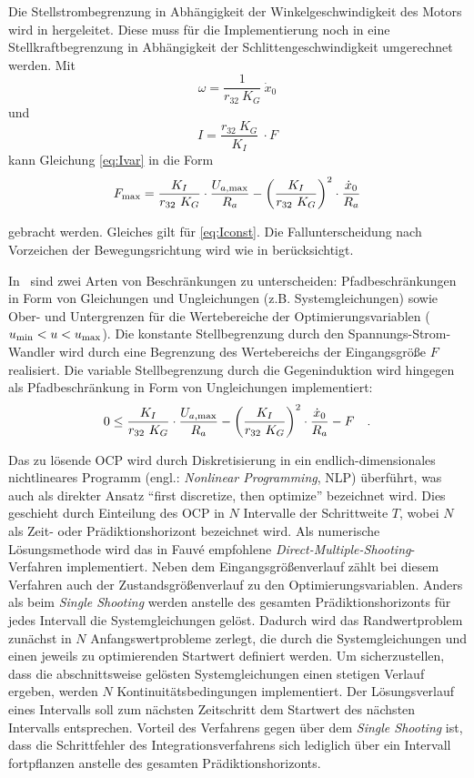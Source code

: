 Die Stellstrombegrenzung in Abhängigkeit der Winkelgeschwindigkeit des Motors wird in  hergeleitet. Diese muss für die Implementierung noch in eine Stellkraftbegrenzung in Abhängigkeit der Schlittengeschwindigkeit umgerechnet werden.
Mit 
	\[
	\omega = \frac{1}{r_{32}\ K_G} \ \dot{x}_0 
\]
und 
	\[
	I = \frac{r_{32}\ K_G}{K_I} \ \cdot F
\]
kann Gleichung \eqref{eq:Ivar} in die Form
	\[
	F_{\mathrm{max}} = \frac{K_I}{r_{32}\ K_G} \cdot \frac{U_{a\mathrm{,max}}}{R_a} - \left(\frac{K_I}{r_{32}\ K_G}\right)^2 \cdot \frac{\dot{x}_0}{R_a}
\]

gebracht werden. Gleiches gilt für \eqref{eq:Iconst}. Die Fallunterscheidung nach Vorzeichen der Bewegungsrichtung wird wie in  berücksichtigt. 

In \casadi\ sind zwei Arten von Beschränkungen zu unterscheiden: Pfadbeschränkungen in Form von Gleichungen und Ungleichungen (z.B. Systemgleichungen) sowie Ober- und Untergrenzen für die Wertebereiche der Optimierungsvariablen (\zB $u_{\mathrm{min}}<u<u_{\mathrm{max}}$). Die konstante Stellbegrenzung durch den Spannungs-Strom-Wandler wird durch eine Begrenzung des Wertebereichs der Eingangsgröße $F$ realisiert. Die variable Stellbegrenzung durch die Gegeninduktion wird hingegen als Pfadbeschränkung in Form von Ungleichungen implementiert:
\[
	 0 \leq \frac{K_I}{r_{32}\ K_G} \cdot \frac{U_{a\mathrm{,max}}}{R_a} - \left(\frac{K_I}{r_{32}\ K_G}\right)^2 \cdot \frac{\dot{x}_0}{R_a} - F \quad .
\]

Das zu lösende OCP wird durch Diskretisierung in ein endlich-dimensionales nichtlineares Programm (engl.: \textit{Nonlinear Programming}, NLP) überführt, was auch als direkter Ansatz \bzw "`first discretize, then optimize"' bezeichnet wird. Dies geschieht durch Einteilung des OCP in $N$ Intervalle der Schrittweite $T$, wobei $N$ als Zeit- oder Prädiktionshorizont bezeichnet wird. Als numerische Lösungsmethode wird das in Fauvé \cite{fauve} empfohlene \textit{Direct-Multiple-Shooting}-Verfahren implementiert. Neben dem Eingangsgrößenverlauf zählt bei diesem Verfahren auch der Zustandsgrößenverlauf zu den Optimierungsvariablen. Anders als beim \textit{Single Shooting} werden anstelle des gesamten Prädiktionshorizonts für jedes Intervall die Systemgleichungen gelöst. Dadurch wird das Randwertproblem zunächst in $N$ Anfangswertprobleme zerlegt, die durch die Systemgleichungen und einen jeweils zu optimierenden Startwert definiert werden. Um sicherzustellen, dass die abschnittsweise gelösten Systemgleichungen einen stetigen Verlauf ergeben, werden $N$ Kontinuitätsbedingungen implementiert. Der Lösungsverlauf eines Intervalls soll zum nächsten Zeitschritt dem Startwert des nächsten Intervalls entsprechen. Vorteil des Verfahrens gegen über dem \textit{Single Shooting} ist, dass die Schrittfehler des Integrationsverfahrens sich lediglich über ein Intervall fortpflanzen anstelle des gesamten Prädiktionshorizonts.

